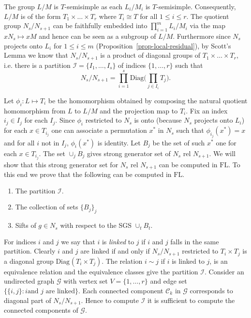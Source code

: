 \documentclass[11pt]{madras}%
\theoremstyle{remark}
\newcommand{\Diag}[2][]{{\ensuremath{\mathrm{Diag}_{{#1}}\left(#2\right)}}}
\begin{document}
The group $L/M$ is $T$-semisimple as each $L_i/M_i$ is $T$-semisimple.
Consequently, $L/M$ is of the form $T_1 \times \ldots \times T_r$
where $T_i \cong T$ for all $1 \leq i \leq r$.  The quotient group
$N_s/N_{s+1}$ can be faithfully embedded into $\prod_{i=1}^m L_i/M_i$
via the map $x N_s \mapsto x M$ and hence can be seen as a subgroup of
$L/M$. Furthermore since $N_s$ projects onto $L_i$ for $1 \leq i \leq
m$ (Proposition~\ref{prop-local-residual}), by Scott's Lemma we know
that $N_s/N_{s+1}$ is a product of diagonal groups of $T_1 \times
\ldots \times T_r$, i.e.  there is a partition $\mathcal{I} = \{ I_1,
\ldots, I_s \}$ of indices $\{ 1, \ldots, r\}$ such that
\[
 N_s/N_{s+1} = \prod_{i = 1}^s \mathrm{Diag}\biggl( \prod_{j \in I_i}
T_j \biggr).
\] 

Let $\phi_i : L \mapsto T_i$ be the homomorphism obtained by composing
the natural quotient homomorphism {from} $L$ to $L/M$ and the
projection map to $T_i$. Fix an index $i_j \in I_j$ for each $I_j$.
Since $\phi_i$ restricted to $N_s$ is onto (because $N_s$ projects
onto $L_i$) for each $x \in T_{i_j}$ one can associate a permutation
$x^*$ in $N_s$ such that $\phi_{i_j}(x^*) = x$ and for all $i$ not in
$I_j$, $\phi_i(x^*)$ is identity.  Let $B_j$ be the set of such $x^*$
one for each $x \in T_{i_j}$. The set $\cup_j B_j$ gives strong
generator set of $N_s$ rel $N_{s+1}$. We will show that this strong
generator set for $N_s$ rel $N_{s+1}$ can be computed in
$\mathrm{FL}$. To this end we prove that the following can be computed
in $\mathrm{FL}$.
\begin{enumerate}
\item The partition $\mathcal{I}$.
\item The collection of sets $\{B_j\}_j$
\item Sifts of $g \in N_s$ with respect to the SGS $\cup_t B_t$.
\end{enumerate}

 For indices $i$ and $j$ we say
that $i$ is \emph{linked} to $j$ if $i$ and $j$ falls in the same
partition. Clearly $i$ and $j$ are linked if and only if $N_s/N_{s+1}$
restricted to $T_i \times T_j$ is a diagonal group $\Diag{T_i \times
  T_j}$.  The relation $i \sim j$ if $i$ is linked to $j$, is an
equivalence relation and the equivalence classes give the partition
$\mathcal{I}$.  Consider an undirected graph $\mathcal{G}$ with vertex
set $V = \{ 1, \ldots, r \}$ and edge set $ \{ \{i,j\} : i \textrm{
  and } j \textrm{ are linked}\}$. Each connected component
$\mathcal{C}_k$ in $\mathcal{G}$ corresponds to diagonal part of
$N_s/{N_{s+1}}$. Hence to compute $\mathcal{I}$ it is sufficient to
compute the connected components of $\mathcal{G}$.
\end{document}
